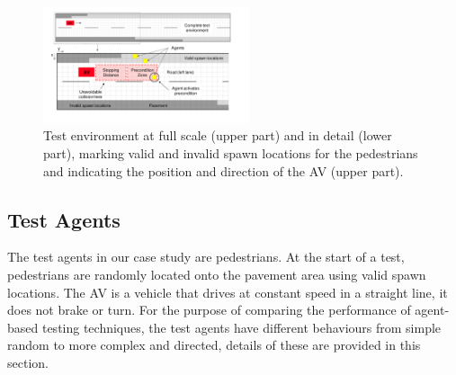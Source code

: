 \documentclass[letterpaper, 10 pt, journal, twoside]{IEEEtran}
\begin{document}



\begin{figure}[!t]
	\centering
\includegraphics[width=0.54\textwidth]{RoadLayout.pdf}
	\caption{Test environment at full scale (upper part) and in detail (lower part), marking valid and invalid spawn locations for the pedestrians and indicating the position and direction of the AV (upper part).}
	\label{gridRoad}
\end{figure}


\subsection{Test Agents}

The test agents in our case study are pedestrians. 
%
At the start of a test, pedestrians are randomly located onto the pavement area using valid spawn locations. The AV is a vehicle that drives at constant speed in a straight line, it does not brake or turn. For the purpose of comparing the performance of agent-based testing techniques, the test agents have different behaviours from simple random to more complex and directed, details of these are provided in this section.
\end{document}
